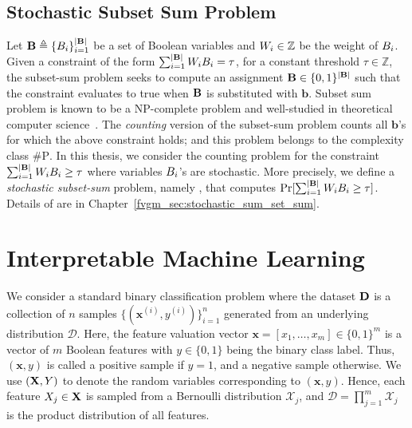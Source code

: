 \subsection{Stochastic Subset Sum Problem} 
Let $ \mathbf{B} \triangleq \{B_i\}_{i=1}^{|\mathbf{B}|}$ be a set of Boolean variables and $ W_i \in \mathbb{Z} $ be the weight of $ B_i $. Given a constraint of the form  $\sum_{i = 1}^ {|\mathbf{B}|} W_i B_i = \tau $, for a constant threshold $ \tau \in \mathbb{Z} $, the subset-sum problem seeks to compute an assignment $\mathbf{B} \in \{0,1\}^{|\mathbf{B}|}$ such that the constraint evaluates to true when $\mathbf{B}$ is substituted with $ \mathbf{b} $. Subset sum problem is known to be a $ \mathrm{NP} $-complete problem and well-studied in theoretical 
computer science~\cite{kleinberg2006algorithm}. The \textit{counting} version of the subset-sum problem counts all $  \mathbf{b}  $'s for which the above constraint holds; and this problem belongs to the complexity class $ \mathrm{\#P} $. In this thesis, we consider the counting problem for the constraint $\sum_{i = 1}^ {|\mathbf{B}|} W_i B_i \ge \tau $ where variables $ B_i $'s are stochastic. More precisely, we define a \textit{stochastic subset-sum} problem, namely {\stochastic}, that computes $ \Pr[\sum_{i = 1}^ {|\mathbf{B}|} W_iB_i \ge \tau] $.    Details of {\stochastic} are in Chapter~\ref{fvgm_sec:stochastic_sum_set_sum}.



\section{Interpretable Machine Learning}
\label{chapter_interpretability_preliminaries}
We consider a standard binary classification problem where the dataset $ \mathbf{D} $ is a collection of $ n $ samples  $\{(\mathbf{x}^{(i)}, y^{(i)})\}_{i=1}^n$ generated from an underlying distribution $\mathcal{D}$.  Here, the feature valuation vector $ \mathbf{x} = [x_1, \dots, x_{m}] \in \{0, 1\}^m $ is a vector of $ m $ Boolean features with $ y \in \{0,1\} $ being the binary class label. Thus, $ (\mathbf{x}, y) $ is called a positive sample if $ y = 1 $, and a negative sample otherwise.  We use $ (\mathbf{X}, Y) $ to denote the random variables corresponding to $ (\mathbf{x}, y) $. Hence, each feature $ X_j \in \mathbf{X} $ is sampled from a Bernoulli distribution $ \mathcal{X}_j $, and $ \mathcal{D} = \prod_{j=1}^m \mathcal{X}_j  $ is the product distribution of all features. 





